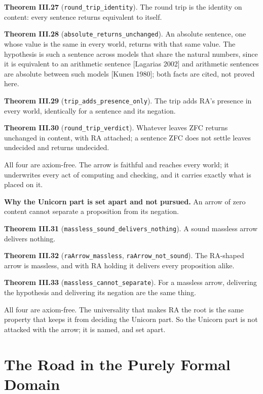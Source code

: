 \documentclass[10pt,twocolumn]{article}
\begin{document}
\textbf{Theorem III.27} (\texttt{round\_trip\_identity}). The round trip
is the identity on content: every sentence returns equivalent to itself.

\textbf{Theorem III.28} (\texttt{absolute\_returns\_unchanged}). An
absolute sentence, one whose value is the same in every world, returns
with that same value. The hypothesis is such a sentence across models
that share the natural numbers, since it is equivalent to an arithmetic
sentence {[}Lagarias 2002{]} and arithmetic sentences are absolute
between such models {[}Kunen 1980{]}; both facts are cited, not proved
here.

\textbf{Theorem III.29} (\texttt{trip\_adds\_presence\_only}). The trip
adds RA's presence in every world, identically for a sentence and its
negation.

\textbf{Theorem III.30} (\texttt{round\_trip\_verdict}). Whatever leaves
ZFC returns unchanged in content, with RA attached; a sentence ZFC does
not settle leaves undecided and returns undecided.

All four are axiom-free. The arrow is faithful and reaches every world;
it underwrites every act of computing and checking, and it carries
exactly what is placed on it.

\textbf{Why the Unicorn part is set apart and not pursued.} An arrow of
zero content cannot separate a proposition from its negation.

\textbf{Theorem III.31} (\texttt{massless\_sound\_delivers\_nothing}). A
sound massless arrow delivers nothing.

\textbf{Theorem III.32} (\texttt{raArrow\_massless},
\texttt{raArrow\_not\_sound}). The RA-shaped arrow is massless, and with
RA holding it delivers every proposition alike.

\textbf{Theorem III.33} (\texttt{massless\_cannot\_separate}). For a
massless arrow, delivering the hypothesis and delivering its negation
are the same thing.

All four are axiom-free. The universality that makes RA the root is the
same property that keeps it from deciding the Unicorn part. So the
Unicorn part is not attacked with the arrow; it is named, and set apart.

\hypertarget{the-road-in-the-purely-formal-domain}{%
\section{The Road in the Purely Formal
Domain}\label{the-road-in-the-purely-formal-domain}}
\end{document}
